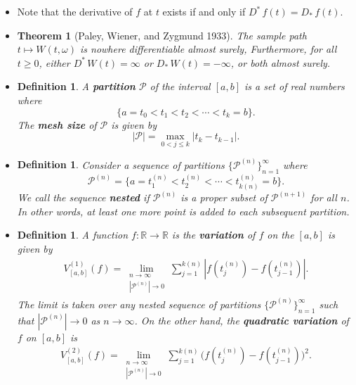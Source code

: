 \documentclass[10pt]{article}
\newtheorem{theorem}[lemma]{Theorem}
\newtheorem{definition}[lemma]{Definition}
\newcommand{\mcal}[1]{\mathcal{#1}}
\newcommand{\Real}{\mathbb{R}}
\begin{document}
\begin{itemize}
  \item Note that the derivative of $f$ at $t$ exists if and only if $D^*\,f(t) = D_*\,f(t)$.
  
  \item \begin{theorem}[Paley, Wiener, and Zygmund 1933]
    The sample path $t \mapsto W(t,\omega)$ is nowhere differentiable almost surely, Furthermore, for all $t \geq 0$, either $D^*\, W(t) = \infty$ or $D_*\,W(t) = -\infty$, or both almost surely.   
  \end{theorem}

  \item \begin{definition}
    A {\bf partition} $\mcal{P}$ of the interval $[a,b]$ is a set of real numbers where $$\{ a = t_0 < t_1 < t_2 < \dotsb < t_k = b \}.$$ The {\bf mesh size} of $\mcal{P}$ is given by
    $$|\mcal{P}| = \max_{0 < j \leq k} |t_k - t_{k-1}|.$$    
  \end{definition}  

  \item \begin{definition}
    Consider a sequence of partitions $\{ \mcal{P}^{(n)} \}_{n=1}^\infty$ where $$\mcal{P}^{(n)} = \{ a = t_1^{(n)} < t_2^{(n)} < \dotsb < t_{k(n)}^{(n)} = b \}.$$ We call the sequence {\bf nested} if $\mcal{P}^{(n)}$ is a proper subset of $\mcal{P}^{(n+1)}$ for all $n$. In other words, at least one more point is added to each subsequent partition.
  \end{definition}

  \item \begin{definition}
    A function $f: \Real \rightarrow \Real$ is the {\bf variation} of $f$ on the $[a,b]$ is given by
    \begin{align*}
      V^{(1)}_{[a,b]}(f) = \lim_{\substack{n \rightarrow \infty\\|\mcal{P}^{(n)}| \rightarrow 0}} \sum_{j=1}^{k(n)} |f(t_j^{(n)}) - f(t_{j-1}^{(n)})|.
    \end{align*}
    The limit is taken over any nested sequence of partitions $\{ \mcal{P}^{(n)} \}_{n=1}^\infty$ such that $|\mcal{P}^{(n)}| \rightarrow 0$ as $n \rightarrow \infty$. On the other hand, the {\bf quadratic variation} of $f$ on $[a,b]$ is
    \begin{align*}
      V^{(2)}_{[a,b]}(f) = \lim_{\substack{n \rightarrow \infty\\|\mcal{P}^{(n)}| \rightarrow 0}} \sum_{j=1}^{k(n)} \Big( f(t_j^{(n)}) - f(t_{j-1}^{(n)})\Big)^2.
    \end{align*}    
  \end{definition}


\end{itemize}
\end{document}
